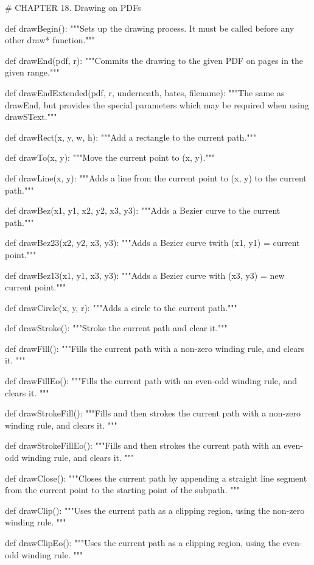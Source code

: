 # CHAPTER 18. Drawing on PDFs

def drawBegin():
    """Sets up the drawing process. It must be called before any other draw*
    function."""

def drawEnd(pdf, r):
    """Commits the drawing to the given PDF on pages in the given range."""

def drawEndExtended(pdf, r, underneath, bates, filename):
    """The same as drawEnd, but provides the special parameters which may be
    required when using drawSText."""

def drawRect(x, y, w, h):
    """Add a rectangle to the current path."""

def drawTo(x, y):
    """Move the current point to (x, y)."""

def drawLine(x, y):
    """Adds a line from the current point to (x, y) to the current path."""

def drawBez(x1, y1, x2, y2, x3, y3):
    """Adds a Bezier curve to the current path."""

def drawBez23(x2, y2, x3, y3):
    """Adds a Bezier curve twith (x1, y1) = current point."""

def drawBez13(x1, y1, x3, y3):
    """Adds a Bezier curve with (x3, y3) = new current point."""

def drawCircle(x, y, r):
    """Adds a circle to the current path."""

def drawStroke():
    """Stroke the current path and clear it."""

def drawFill():
    """Fills the current path with a non-zero winding rule, and clears it. """

def drawFillEo():
    """Fills the current path with an even-odd winding rule, and clears it. """

def drawStrokeFill():
    """Fills and then strokes the current path with a non-zero winding rule,
    and clears it. """

def drawStrokeFillEo():
    """Fills and then strokes the current path with an even-odd winding rule,
    and clears it. """

def drawClose():
    """Closes the current path by appending a straight line segment from the
    current point to the starting point of the subpath. """

def drawClip():
    """Uses the current path as a clipping region, using the non-zero winding
    rule. """

def drawClipEo():
    """Uses the current path as a clipping region, using the even-odd winding
    rule. """

